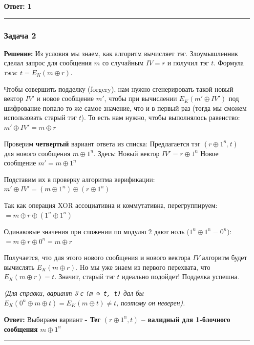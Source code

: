﻿\documentclass[9pt,a4paper]{extarticle}
\begin{document}
\textbf{Ответ: 1}

\begin{center}\rule{0.5\linewidth}{0.5pt}\end{center}

\subsubsection{Задача 2}\label{ux437ux430ux434ux430ux447ux430-2}

\textbf{Решение:} Из условия мы знаем, как алгоритм вычисляет тэг. Злоумышленник сделал запрос для сообщения \(m\) со случайным \(IV = r\) и получил тэг \(t\). Формула тэга: \(t = E_K(m \oplus r)\).

Чтобы совершить подделку (forgery), нам нужно сгенерировать такой новый вектор \(IV'\) и новое сообщение \(m'\), чтобы при вычислении \(E_K(m' \oplus IV')\) под шифрование попало то же самое значение, что и в первый раз (тогда мы сможем использовать старый тэг \(t\)). То есть нам нужно, чтобы выполнялось равенство: \(m' \oplus IV' = m \oplus r\)

Проверим \textbf{четвертый} вариант ответа из списка: Предлагается тэг \textbf{\((r \oplus 1^n, t)\)} для нового сообщения \textbf{\(m \oplus 1^n\)}. Здесь: Новый вектор \(IV' = r \oplus 1^n\) Новое сообщение \(m' = m \oplus 1^n\)

Подставим их в проверку алгоритма верификации: \(m' \oplus IV' = (m \oplus 1^n) \oplus (r \oplus 1^n)\)

Так как операция XOR ассоциативна и коммутативна, перегруппируем: \(= m \oplus r \oplus (1^n \oplus 1^n)\)

Одинаковые значения при сложении по модулю 2 дают ноль (\(1^n \oplus 1^n = 0^n\)): \(= m \oplus r \oplus 0^n = m \oplus r\)

Получается, что для этого нового сообщения и нового вектора \(IV\) алгоритм будет вычислять \(E_K(m \oplus r)\). Но мы уже знаем из первого перехвата, что \(E_K(m \oplus r) = t\). Значит, старый тэг \(t\) идеально подойдет! Подделка успешна.

\emph{(Для справки, вариант 3 с \texttt{(m\ ⊕\ t,\ t)} дал бы \(E_K(0^n \oplus m \oplus t) = E_K(m \oplus t) \neq t\), поэтому он неверен).}

\textbf{Ответ:} Выбираем вариант \textbf{- Тег \((r \oplus 1^n, t)\) -- валидный для 1-блочного сообщения \(m \oplus 1^n\)}

\begin{center}\rule{0.5\linewidth}{0.5pt}\end{center}
\end{document}
